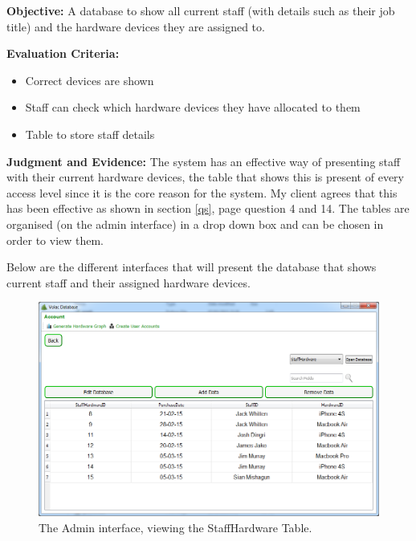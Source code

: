 \textbf{Objective:} A database to show all current staff (with details such as their job title) and the hardware devices they are assigned to.

\textbf{Evaluation Criteria:}
\begin{itemize}
\item{Correct devices are shown}
\item{Staff can check which hardware devices they have allocated to them}
\item{Table to store staff details}
\end{itemize}

\textbf{Judgment and Evidence:}
The system has an effective way of presenting staff with their current hardware devices, the table that shows this is present of every access level since it is the core reason for the system. My client agrees that this has been effective as shown in section \ref{qs}, page \pageref{qs} question 4 and 14. The tables are organised (on the admin interface) in a drop down box and can be chosen in order to view them.

Below are the different interfaces that will present the database that shows current staff and their assigned hardware devices.

\begin{figure}[H]
    \includegraphics[width=\textwidth]{./Evaluation/Images/Database1.png}
    \caption{The Admin interface, viewing the StaffHardware Table.} \label{fig:db1}
\end{figure}

